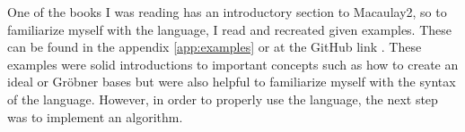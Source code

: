 One of the books I was reading \cite{Applied} has an introductory section to Macaulay2, so to familiarize myself with the language, I read and recreated given examples. These can be found in the appendix \ref{app:examples} or at the GitHub link \cite{Github}. These examples were solid introductions to important concepts such as how to create an ideal or Gröbner bases but were also helpful to familiarize myself with the syntax of the language. However, in order to properly use the language, the next step was to implement an algorithm. 